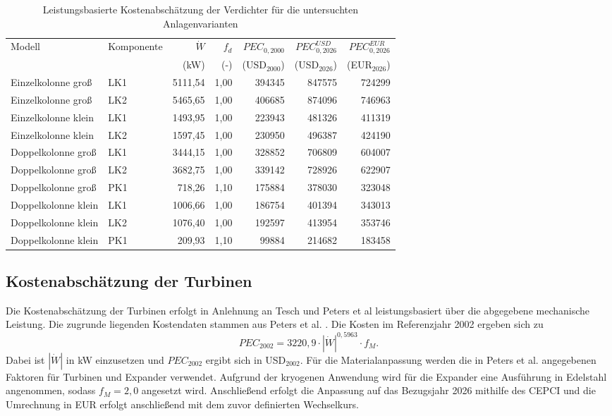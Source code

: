\begin{table}[H]
\centering
\caption{Leistungsbasierte Kostenabschätzung der Verdichter für die untersuchten Anlagenvarianten}
\label{tab:kosten_verdichter}
\begin{tabular}{llrrrrr}
\hline
Modell & Komponente & $\dot W$ & $f_d$ & $PEC_{0,2000}$ & $PEC_{0,2026}^{USD}$ & $PEC_{0,2026}^{EUR}$ \\
 & & (kW) & (-) & (USD$_{2000}$) & (USD$_{2026}$) & (EUR$_{2026}$) \\
\hline
Einzelkolonne groß & LK1 & 5111{,}54 & 1{,}00 & 394345 & 847575 & 724299 \\
Einzelkolonne groß & LK2 & 5465{,}65 & 1{,}00 & 406685 & 874096 & 746963 \\
Einzelkolonne klein & LK1 & 1493{,}95 & 1{,}00 & 223943 & 481326 & 411319 \\
Einzelkolonne klein & LK2 & 1597{,}45 & 1{,}00 & 230950 & 496387 & 424190 \\
Doppelkolonne groß & LK1 & 3444{,}15 & 1{,}00 & 328852 & 706809 & 604007 \\
Doppelkolonne groß & LK2 & 3682{,}75 & 1{,}00 & 339142 & 728926 & 622907 \\
Doppelkolonne groß & PK1 & 718{,}26 & 1{,}10 & 175884 & 378030 & 323048 \\
Doppelkolonne klein & LK1 & 1006{,}66 & 1{,}00 & 186754 & 401394 & 343013 \\
Doppelkolonne klein & LK2 & 1076{,}40 & 1{,}00 & 192597 & 413954 & 353746 \\
Doppelkolonne klein & PK1 & 209{,}93 & 1{,}10 & 99884 & 214682 & 183458 \\
\hline
\end{tabular}
\end{table}

\subsection*{Kostenabschätzung der Turbinen}

Die Kostenabschätzung der Turbinen erfolgt in Anlehnung an Tesch \cite{teschExergybasedMethodsApplied} und Peters et al \cite{peters_plant_2004} leistungsbasiert über die abgegebene mechanische Leistung. Die zugrunde liegenden Kostendaten stammen aus Peters et al. \cite{peters_plant_2004}. Die Kosten im Referenzjahr 2002 ergeben sich zu
\begin{equation}
PEC_{2002} = 3220{,}9 \cdot |\dot W|^{0{,}5963} \cdot f_M .
\end{equation}
Dabei ist $|\dot W|$ in kW einzusetzen und $PEC_{2002}$ ergibt sich in USD$_{2002}$. Für die Materialanpassung werden die in Peters et al. angegebenen Faktoren für Turbinen und Expander verwendet. Aufgrund der kryogenen Anwendung wird für die Expander eine Ausführung in Edelstahl angenommen, sodass $f_M=2{,}0$ angesetzt wird.
Anschließend erfolgt die Anpassung auf das Bezugsjahr 2026 mithilfe des CEPCI und die Umrechnung in EUR erfolgt anschließend mit dem zuvor definierten Wechselkurs.

